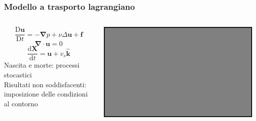 \begin{frame}
\frametitle{Modello a trasporto lagrangiano}
\begin{columns}

  \[ \frac{\mathrm{D}\mathbf{u}}{\mathrm{D}t} = -\boldsymbol\nabla p + \nu \Delta \mathbf{u} + \mathbf{f} \]
\[ \boldsymbol\nabla \cdot \mathbf{u} = 0 \]
  \[ \frac{\mathrm{d}\mathbf{X}} {\mathrm{d}t} = \mathbf{u} + v_s\mathbf{\hat{k}} \]
  Nascita e morte: processi stocastici
  \\
  Risultati non soddisfacenti: imposizione delle condizioni al contorno

\includegraphics[width=\textwidth]{../img/euleriano_termalizzato}

\end{columns}
\end{frame}


